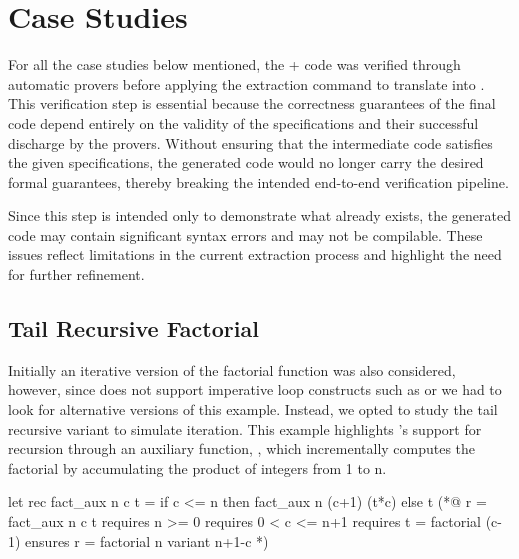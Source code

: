 

\section{Case Studies}

For all the case studies below mentioned, the \ocaml + \gospel code was verified through \whythree automatic
provers before applying the extraction command to translate into \cml. This verification step is essential because the correctness 
guarantees of the final \cml code depend entirely on the validity of the specifications and their successful discharge by the 
provers. Without ensuring that the \whyml intermediate code satisfies the given specifications, the generated \cml code would 
no longer carry the desired formal guarantees, thereby breaking the intended end-to-end verification pipeline.

Since this step is intended only to demonstrate what already exists, the generated code may contain significant syntax errors 
and may not be compilable. These issues reflect limitations in the current extraction process and highlight the need for 
further refinement.

\subsection{Tail Recursive Factorial}

Initially an iterative version of the factorial function was also considered, however, since \cml does not support imperative loop 
constructs such as  or  we had to look for alternative versions of this example. Instead, we opted 
to study the tail recursive variant to simulate iteration. This example highlights \ocaml's support for recursion through an auxiliary 
function, , which incrementally computes the factorial by accumulating the product of integers from 1 to n.

\begin{gospell}
let rec fact_aux n c t =
  if c <= n then fact_aux n (c+1) (t*c) else t
(*@
  r = fact_aux n c t
  requires n >= 0
  requires 0 < c <= n+1
  requires t = factorial (c-1)
  ensures r = factorial n
  variant n+1-c
*)
\end{gospell}

